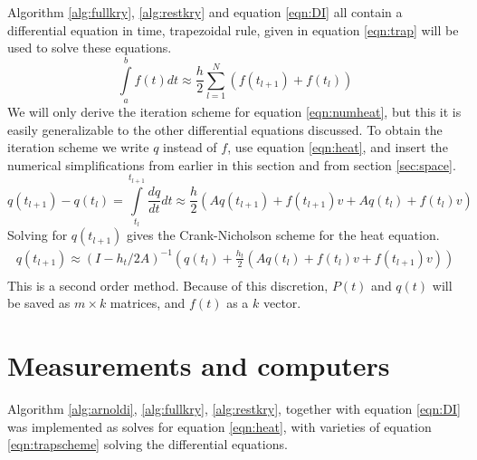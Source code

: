 Algorithm \ref{alg:fullkry}, \ref{alg:restkry} and equation \ref{eqn:DI} all contain a differential equation in time,
trapezoidal rule\cite{trap}, given in equation \eqref{eqn:trap} will be used to solve these equations. 
\begin{equation} \label{eqn:trap}
\int \limits_a^b f(t) dt \approx \frac{h}{2} \sum \limits_{l = 1}^N(f(t_{l+1})+f(t_l))
\end{equation}
We will only derive the iteration scheme for equation \eqref{eqn:numheat}, but 
this it is easily generalizable to the other differential equations discussed.
To obtain the iteration scheme we write $q$ instead of $f$, use equation \eqref{eqn:heat}, and insert the numerical simplifications from earlier in this section and from section \ref{sec:space}.
\begin{equation}
q(t_{l+1}) - q(t_l) = \int \limits_{t_l}^{t_{l+1}} \frac{d q}{d t} dt \approx \frac{h}{2}(A q(t_{l+1})+f(t_{l+1})v +A q(t_l)+f(t_l) v) 
\end{equation}
Solving for $q(t_{l+1})$ gives the Crank-Nicholson scheme for the heat equation.
\begin{equation} \label{eqn:trapscheme}
\begin{aligned}
q(t_{l+1}) \approx (I-h_t/2 A)^{-1}(q(t_l) + \frac{h_t}{2}( A q(t_{l}) + f(t_l)v+f(t_{l+1})v))\\
\end{aligned}
\end{equation} 
This is a second order method.
Because of this discretion, $P(t)$ and $q(t)$ will be saved as $m \times k $ matrices, and $f(t)$ as a $k$ vector.

\section{Measurements and computers} \label{sec:not}
Algorithm \ref{alg:arnoldi}, \ref{alg:fullkry}, \ref{alg:restkry}, together with equation \ref{eqn:DI} was implemented as solves for equation \ref{eqn:heat}, with varieties of equation \ref{eqn:trapscheme} solving the differential equations. 

